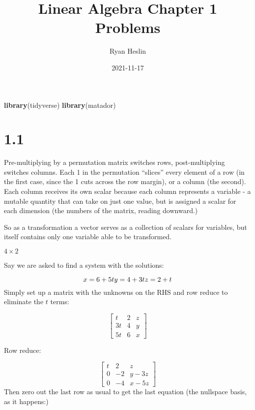 \documentclass[]{article}
\title{Linear Algebra Chapter 1 Problems}
\author{Ryan Heslin}
\date{2021-11-17}
\newenvironment{Shaded}{\begin{snugshade}}{\end{snugshade}}
\newcommand{\KeywordTok}[1]{\textcolor[rgb]{0.13,0.29,0.53}{\textbf{#1}}}
\newcommand{\NormalTok}[1]{#1}
\begin{document}
\maketitle

\begin{Shaded}
\begin{Highlighting}[]
\KeywordTok{library}\NormalTok{(tidyverse)}
\KeywordTok{library}\NormalTok{(matador)}
\end{Highlighting}
\end{Shaded}

\hypertarget{section}{%
\section{1.1}\label{section}}

Pre-multiplying by a permutation matrix switches rows, post-multiplying
switches columns. Each 1 in the permutation ``slices'' every element of
a row (in the first case, since the 1 cuts across the row margin), or a
column (the second). Each column receives its own scalar because each
column represents a variable - a mutable quantity that can take on just
one value, but is assigned a scalar for each dimension (the numbers of
the matrix, reading downward.)

So as a transformation a vector serves as a collection of scalars for
variables, but itself contains only one variable able to be transformed.

\newcommand{\di}[2]{#1\times{#2}}
\newcommand{\m}[1]{\begin{bmatrix}#1\end{bmatrix}}

\(4\times{2}\)

Say we are asked to find a system with the solutions:

\[x=6+5t\\
y=4+3t\\
z=2+t\] Simply set up a matrix with the unknowns on the RHS and row
reduce to eliminate the \(t\) terms:

\[\begin{bmatrix}
t&2&z\\
3t&4&y\\
5t&6&x\end{bmatrix}\]

Row reduce:

\[\begin{bmatrix}
t&2&z\\
0&-2&y-3z\\
0&-4&x-5z\end{bmatrix}\] Then zero out the last row as usual to get the
last equation (the nullspace basis, as it happens:)
\end{document}
